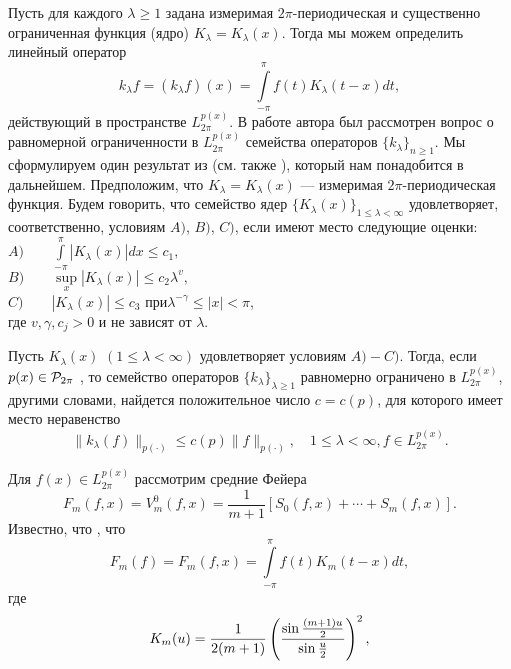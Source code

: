 Пусть для каждого $\lambda\geq1$ задана измеримая
 $2\pi$-периодическая и существенно ограниченная  функция (ядро)
 $K_{\lambda}=K_{\lambda}(x)$. Тогда мы можем определить линейный
 оператор
  \begin{equation}\label{4.2}
    k_{\lambda}f=(k_{\lambda}f)(x)=\int\limits_{-\pi}^{\pi}f(t)K_{\lambda}(t-x)dt,
 \end{equation}
действующий в пространстве $L_{2\pi}^{p(x)}$. В работе автора \cite{Shar5} был рассмотрен
 вопрос о равномерной ограниченности в $L^{p(x)}_{2\pi}$
семейства операторов $\{k_{\lambda}\}_{n\geq1}$.   Мы сформулируем один результат из \cite{Shar5} (см. также \cite{Shar3}), который нам понадобится в дальнейшем.
Предположим, что $K_{\lambda}=K_{\lambda}(x)$ ---
измеримая $2\pi$-периодическая функция. Будем говорить, что
семейство ядер $\{K_{\lambda}(x)\}_{1\leq\lambda<\infty}$
удовлетворяет, соответственно, условиям $A)$, $B)$, $C)$, если имеют
место следующие оценки:\\
$A)\qquad\int\limits_{-\pi}^{\pi}|K_{\lambda}(x)|dx\le c_{1},$\\
$B)\qquad\sup\limits_{x}|K_{\lambda}(x)|\leq c_{2}\lambda^{v},$\\
$C)\qquad|K_{\lambda}(x)|\leq c_{3}\text{ при
}\lambda^{-\gamma}\leq|x|<\pi$,\\
где $v,\gamma, c_{j}>0$ и не зависят от $\lambda$.
\begin{theorem}\label{t A}
 Пусть $K_{\lambda}(x)$
$(1\leq\lambda<\infty)$ удовлетворяет условиям $A) - C)$. Тогда,
если $ p(x)\in {\cal P}_{2\pi} $ ,  то семейство операторов $\{k_{\lambda}\}_{\lambda\geq1}$ равномерно
ограничено в $L_{2\pi}^{p(x)}$, другими словами, найдется положительное число $c=c(p)$, для которого имеет место неравенство
$$
 \|k_{\lambda}(f)\|_{p(\cdot)}\le c(p)\|f\|_{p(\cdot)},\quad 1\leq\lambda<\infty, f\in L_{2\pi}^{p(x)}.
 $$
\end{theorem}
Для $f(x)\in L_{2\pi}^{p(x)}$  рассмотрим средние Фейера
\begin{equation}\label{4.3}
    F_m(f,x)=V_m^0(f,x)=\frac1{m+1}[S_0(f,x)+\cdots+S_{m}(f,x)].
\end{equation}
Известно, что \cite{Zigmund}, что
\begin{equation}\label{4.4}
    F_m(f)=F_m(f,x)=\int\limits_{-\pi}^{\pi}f(t)K_{m}(t-x)dt,
\end{equation}
где
\begin{equation}\label{4.5}
    K_{m}(u)=\frac1{2(m+1)}\left({\sin  \frac{(m+1)u}{2}\over\sin \frac{u}{2}}\right)^2,
\end{equation}
